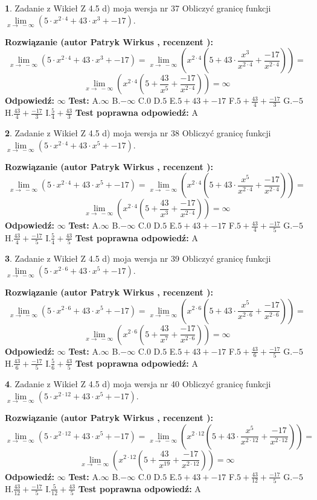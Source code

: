 \documentclass[12pt, a4paper]{article}
\theoremstyle{definition} %
\newtheorem{zad}{}
\newcommand{\zadStart}[1]{\begin{zad}#1\newline}
\newcommand{\zadStop}{\end{zad}}
\newcommand{\rozwStart}[2]{\noindent \textbf{Rozwiązanie (autor #1 , recenzent #2): }\newline}
\newcommand{\rozwStop}{\newline}
\newcommand{\odpStart}{\noindent \textbf{Odpowiedź:}\newline}
\newcommand{\odpStop}{\newline}
\newcommand{\testStart}{\noindent \textbf{Test:}\newline}
\newcommand{\testStop}{\newline}
\newcommand{\kluczStart}{\noindent \textbf{Test poprawna odpowiedź:}\newline}
\newcommand{\kluczStop}{\newline}
\begin{document}
\zadStart{Zadanie z Wikieł Z 4.5 d) moja wersja nr 37}
Obliczyć granicę funkcji  $\lim\limits_{x\to\ -\infty}(5 \cdot x^{2\cdot4}+43 \cdot x^{3}+-17)$.
\zadStop
\rozwStart{Patryk Wirkus}{}
$$\lim\limits_{x\to\ -\infty}(5 \cdot x^{2\cdot4}+43 \cdot x^{3}+-17) = \lim\limits_{x\to\ -\infty}(x^{2\cdot4}(5 +43 \cdot \frac{x^{3}}{x^{2\cdot4}}+\frac{-17}{x^{2\cdot4}})) =$$ $$\lim\limits_{x\to\ -\infty}(x^{2\cdot4}(5 +\frac{43}{x^{5}}+\frac{-17}{x^{2\cdot4}})) =\infty$$
\rozwStop
\odpStart
$\infty$
\odpStop
\testStart
A.$\infty$ B.$-\infty$ C.$0$ D.$5$ E.$5 + 43 + -17$
F.$5+\frac{43}{4}+\frac{-17}{3}$ G.$-5$
H.$\frac{43}{4}+\frac{-17}{3}$
I.$\frac{5}{4}+\frac{43}{3}$
\testStop
\kluczStart
A
\kluczStop



\zadStart{Zadanie z Wikieł Z 4.5 d) moja wersja nr 38}
Obliczyć granicę funkcji  $\lim\limits_{x\to\ -\infty}(5 \cdot x^{2\cdot4}+43 \cdot x^{5}+-17)$.
\zadStop
\rozwStart{Patryk Wirkus}{}
$$\lim\limits_{x\to\ -\infty}(5 \cdot x^{2\cdot4}+43 \cdot x^{5}+-17) = \lim\limits_{x\to\ -\infty}(x^{2\cdot4}(5 +43 \cdot \frac{x^{5}}{x^{2\cdot4}}+\frac{-17}{x^{2\cdot4}})) =$$ $$\lim\limits_{x\to\ -\infty}(x^{2\cdot4}(5 +\frac{43}{x^{3}}+\frac{-17}{x^{2\cdot4}})) =\infty$$
\rozwStop
\odpStart
$\infty$
\odpStop
\testStart
A.$\infty$ B.$-\infty$ C.$0$ D.$5$ E.$5 + 43 + -17$
F.$5+\frac{43}{4}+\frac{-17}{5}$ G.$-5$
H.$\frac{43}{4}+\frac{-17}{5}$
I.$\frac{5}{4}+\frac{43}{5}$
\testStop
\kluczStart
A
\kluczStop



\zadStart{Zadanie z Wikieł Z 4.5 d) moja wersja nr 39}
Obliczyć granicę funkcji  $\lim\limits_{x\to\ -\infty}(5 \cdot x^{2\cdot6}+43 \cdot x^{5}+-17)$.
\zadStop
\rozwStart{Patryk Wirkus}{}
$$\lim\limits_{x\to\ -\infty}(5 \cdot x^{2\cdot6}+43 \cdot x^{5}+-17) = \lim\limits_{x\to\ -\infty}(x^{2\cdot6}(5 +43 \cdot \frac{x^{5}}{x^{2\cdot6}}+\frac{-17}{x^{2\cdot6}})) =$$ $$\lim\limits_{x\to\ -\infty}(x^{2\cdot6}(5 +\frac{43}{x^{7}}+\frac{-17}{x^{2\cdot6}})) =\infty$$
\rozwStop
\odpStart
$\infty$
\odpStop
\testStart
A.$\infty$ B.$-\infty$ C.$0$ D.$5$ E.$5 + 43 + -17$
F.$5+\frac{43}{6}+\frac{-17}{5}$ G.$-5$
H.$\frac{43}{6}+\frac{-17}{5}$
I.$\frac{5}{6}+\frac{43}{5}$
\testStop
\kluczStart
A
\kluczStop



\zadStart{Zadanie z Wikieł Z 4.5 d) moja wersja nr 40}
Obliczyć granicę funkcji  $\lim\limits_{x\to\ -\infty}(5 \cdot x^{2\cdot12}+43 \cdot x^{5}+-17)$.
\zadStop
\rozwStart{Patryk Wirkus}{}
$$\lim\limits_{x\to\ -\infty}(5 \cdot x^{2\cdot12}+43 \cdot x^{5}+-17) = \lim\limits_{x\to\ -\infty}(x^{2\cdot12}(5 +43 \cdot \frac{x^{5}}{x^{2\cdot12}}+\frac{-17}{x^{2\cdot12}})) =$$ $$\lim\limits_{x\to\ -\infty}(x^{2\cdot12}(5 +\frac{43}{x^{19}}+\frac{-17}{x^{2\cdot12}})) =\infty$$
\rozwStop
\odpStart
$\infty$
\odpStop
\testStart
A.$\infty$ B.$-\infty$ C.$0$ D.$5$ E.$5 + 43 + -17$
F.$5+\frac{43}{12}+\frac{-17}{5}$ G.$-5$
H.$\frac{43}{12}+\frac{-17}{5}$
I.$\frac{5}{12}+\frac{43}{5}$
\testStop
\kluczStart
A
\kluczStop
\end{document}
